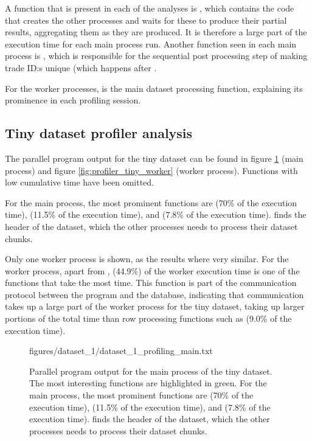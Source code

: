 A function that is present in each of the analyses is , which contains the code that creates the
other processes and waits for these to produce their partial results, aggregating them as they are produced. It is therefore a large
part of the execution time for each main process run. Another function seen in each main process is ,
which is responsible for the sequential post processing step of making trade ID:s unique (which happens after .

For the worker processes,  is the main dataset processing function, explaining its prominence in each profiling session.

\subsection{Tiny dataset profiler analysis}
The parallel program  output for the tiny dataset can be found in figure \ref{fig:profiler_tiny_main} (main process)
and figure \ref{fig:profiler_tiny_worker} (worker process). Functions with low cumulative time have been omitted.

For the main process, the most prominent functions are  (70\% of the execution time),  (11.5\% of
the execution time), and  (7.8\% of the execution time).
 finds the header of the dataset, which the other processes needs to process their dataset chunks. 

Only one worker process is shown, as the results where very similar.
For the worker process, apart from ,  (44.9\%) of the worker execution time
is one of the functions that take the most time. This function
is part of the communication protocol between the program and the database, indicating that communication takes up a large part of the
worker process for the tiny dataset, taking up larger portions of the total time than row processing functions such as  (9.0\% of the execution time).

\begin{figure}[ht]
  \begin{VerbatimInput}{figures/dataset_1/dataset_1_profiling_main.txt}
    \caption[Parallel program  output for the main process of the tiny dataset.]{Parallel program  output for the main process of the tiny dataset.
    The most interesting functions are highlighted in green.
For the main process, the most prominent functions are  (70\% of the execution time),  (11.5\% of
the execution time), and  (7.8\% of the execution time).
   finds the header of the dataset, which the other processes needs to process their dataset chunks.}
  \label{fig:profiler_tiny_main}
\end{VerbatimInput}
\end{figure}

